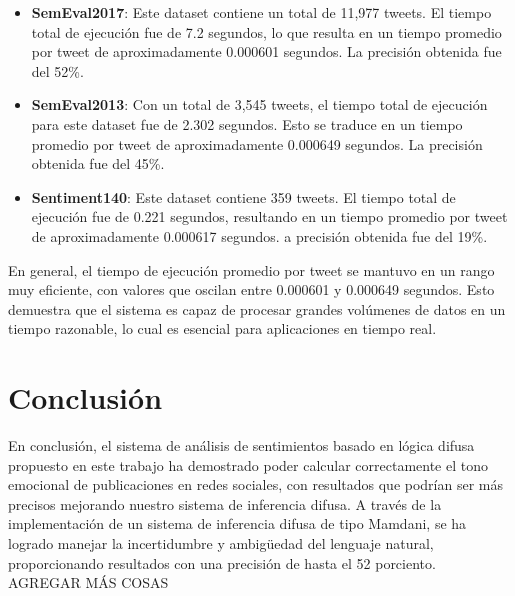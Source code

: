 \documentclass[sigconf, review=false, nonacm]{acmart}
\begin{document}
\begin{itemize}
	\item \textbf{SemEval2017}: Este dataset contiene un total de 11,977 tweets. El tiempo total
		de ejecución fue de 7.2 segundos, lo que resulta en un tiempo promedio por tweet de
		aproximadamente 0.000601 segundos. La precisión obtenida fue del 52\%.

	\item \textbf{SemEval2013}: Con un total de 3,545 tweets, el tiempo total de ejecución para este
	dataset fue de 2.302 segundos. Esto se traduce en un tiempo promedio por tweet de
	aproximadamente 0.000649 segundos. La precisión obtenida fue del 45\%.

	\item \textbf{Sentiment140}: Este dataset contiene 359 tweets. El tiempo total de ejecución
	fue de 0.221 segundos, resultando en un tiempo promedio por tweet de aproximadamente 0.000617 segundos. 
	a precisión obtenida fue del 19\%.
\end{itemize}

En general, el tiempo de ejecución promedio por tweet se mantuvo en un rango muy eficiente, con valores que oscilan entre 0.000601 y 0.000649 segundos. Esto demuestra que el sistema es capaz de procesar grandes volúmenes de datos en un tiempo razonable, lo cual es esencial para aplicaciones en tiempo real.

\section{Conclusión}
En conclusión, el sistema de análisis de sentimientos basado en lógica difusa propuesto en este 
trabajo ha demostrado poder calcular correctamente el tono emocional de publicaciones en redes sociales,
con resultados que podrían ser más precisos mejorando nuestro sistema de inferencia difusa. A través
de la implementación de un sistema de inferencia difusa de tipo Mamdani, se ha logrado manejar la
incertidumbre y ambigüedad del lenguaje natural, proporcionando resultados con una precisión de hasta el 52 porciento.
AGREGAR MÁS COSAS

\nocite{libro}


\end{document}
